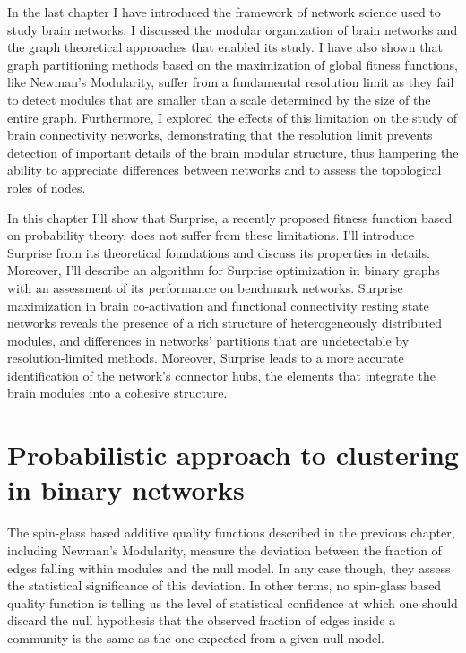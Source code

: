 In the last chapter I have introduced the framework of network science used to study brain networks.
I discussed the modular organization of brain networks and the graph theoretical approaches that enabled its study.
I have also shown that graph partitioning methods based on the maximization of global fitness functions, like Newman's Modularity, suffer from a fundamental resolution limit as they fail to detect modules that are smaller than a scale determined by the size of the entire graph.
Furthermore, I explored the effects of this limitation on the study of brain connectivity networks, demonstrating that the resolution limit prevents detection of important details of the brain modular structure, thus hampering the ability to appreciate differences between networks and to assess the topological roles of nodes.

In this chapter I'll show that Surprise, a recently proposed fitness function based on probability theory, does not suffer from these limitations.
I'll introduce Surprise from its theoretical foundations and discuss its properties in details.
Moreover, I'll describe an algorithm for Surprise optimization in binary graphs with an assessment of its performance on benchmark networks.
Surprise maximization in brain co-activation and functional connectivity resting state networks reveals the presence of a rich structure of heterogeneously distributed modules, and differences in networks' partitions that are undetectable by resolution-limited methods.
Moreover, Surprise leads to a more accurate identification of the network's connector hubs, the elements that integrate the brain modules into a cohesive structure.

\section{Probabilistic approach to clustering in binary networks}\label{sec:probability_clustering}
The spin-glass based additive quality functions described in the previous chapter, including Newman's Modularity, measure the deviation between the fraction of edges falling within modules and the null model. In any case though, they assess the statistical significance of this deviation.
In other terms, no spin-glass based quality function is telling us the level of statistical confidence at which one should discard the null hypothesis that the observed fraction of edges inside a community is the same as the one expected from a given null model.

